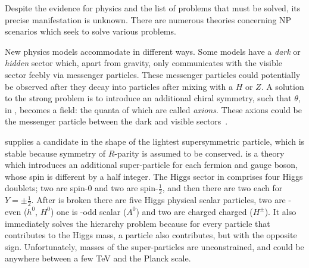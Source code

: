 
Despite the evidence for \bsm physics and the list of problems that must be solved, its precise
manifestation is unknown.
There are numerous theories concerning NP scenarios which seek to solve various problems.

New physics models accommodate \dm in different ways.
Some models have a \emph{dark} or \emph{hidden} sector which, apart from gravity, only
communicates with the visible sector feebly via messenger particles.
These messenger particles could potentially be observed after they decay into \sm particles after
mixing with a $H$ or $Z$.
A solution to the strong \CP problem is to introduce an additional chiral symmetry, such that
$\theta$, in , becomes a field: the quanta of which are called \emph{axions}.
These axions could be the messenger particle between the dark and visible
sectors~\cite{Peccei:2006as}.










\SUSY supplies a \dm candidate in the shape of the lightest supersymmetric particle,
which is stable because symmetry of $R$-parity is assumed to be conserved.
\SUSY is a theory which introduces an additional super-particle for each \sm fermion and
gauge boson, whose spin is different by a half integer.
The Higgs sector in \SUSY comprises four Higgs doublets; two are spin-0 and two are spin-$\tfrac12$,
and then there are two each for $Y=\pm\tfrac12$.
After \SUSY is broken there are five Higgs physical scalar particles, two are \CP-even ($h^0$,
$H^0$) one is \CP-odd scalar ($A^0$) and two are charged charged ($H^\pm$).
It also immediately solves the hierarchy problem because for every \sm particle that contributes to
the Higgs mass, a \SUSY particle also contributes, but with the opposite sign.
Unfortunately, masses of the super-particles are unconstrained, and could be anywhere between a few
TeV and the Planck scale.


